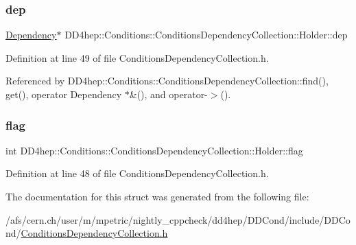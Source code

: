 \subsubsection{\texorpdfstring{dep}{dep}}
{\footnotesize\ttfamily \hyperlink{class_d_d4hep_1_1_conditions_1_1_conditions_dependency_collection_a87252585d3e17ae82813c039b1b47e8a}{Dependency}$\ast$ D\+D4hep\+::\+Conditions\+::\+Conditions\+Dependency\+Collection\+::\+Holder\+::dep}



Definition at line 49 of file Conditions\+Dependency\+Collection.\+h.



Referenced by D\+D4hep\+::\+Conditions\+::\+Conditions\+Dependency\+Collection\+::find(), get(), operator Dependency $\ast$\&(), and operator-\/$>$().

\hypertarget{struct_d_d4hep_1_1_conditions_1_1_conditions_dependency_collection_1_1_holder_a0e505e33fbee2f24378e55527d99c6d3}{}\label{struct_d_d4hep_1_1_conditions_1_1_conditions_dependency_collection_1_1_holder_a0e505e33fbee2f24378e55527d99c6d3} 
\subsubsection{\texorpdfstring{flag}{flag}}
{\footnotesize\ttfamily int D\+D4hep\+::\+Conditions\+::\+Conditions\+Dependency\+Collection\+::\+Holder\+::flag}



Definition at line 48 of file Conditions\+Dependency\+Collection.\+h.



The documentation for this struct was generated from the following file\+:\begin{DoxyCompactItemize}
\item 
/afs/cern.\+ch/user/m/mpetric/nightly\+\_\+cppcheck/dd4hep/\+D\+D\+Cond/include/\+D\+D\+Cond/\hyperlink{_conditions_dependency_collection_8h}{Conditions\+Dependency\+Collection.\+h}\end{DoxyCompactItemize}
